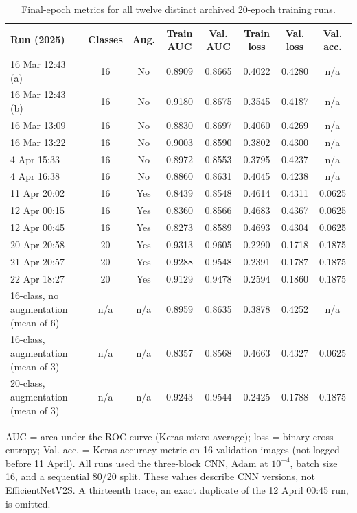 \documentclass[11pt]{article}
\begin{document}
\begin{table}[!htbp]
\centering\small
\caption{Final-epoch metrics for all twelve distinct archived 20-epoch training runs.}
\label{tab:training-runs}
\footnotesize\setlength{\tabcolsep}{3pt}
\begin{tabular}{lccccccc}
\toprule
Run (2025) & Classes & Aug. & Train AUC & Val. AUC & Train loss & Val. loss & Val. acc. \\
\midrule
16 Mar 12:43 (a) & 16 & No & 0.8909 & 0.8665 & 0.4022 & 0.4280 & n/a \\
16 Mar 12:43 (b) & 16 & No & 0.9180 & 0.8675 & 0.3545 & 0.4187 & n/a \\
16 Mar 13:09 & 16 & No & 0.8830 & 0.8697 & 0.4060 & 0.4269 & n/a \\
16 Mar 13:22 & 16 & No & 0.9003 & 0.8590 & 0.3802 & 0.4300 & n/a \\
4 Apr 15:33 & 16 & No & 0.8972 & 0.8553 & 0.3795 & 0.4237 & n/a \\
4 Apr 16:38 & 16 & No & 0.8860 & 0.8631 & 0.4045 & 0.4238 & n/a \\
11 Apr 20:02 & 16 & Yes & 0.8439 & 0.8548 & 0.4614 & 0.4311 & 0.0625 \\
12 Apr 00:15 & 16 & Yes & 0.8360 & 0.8566 & 0.4683 & 0.4367 & 0.0625 \\
12 Apr 00:45 & 16 & Yes & 0.8273 & 0.8589 & 0.4693 & 0.4304 & 0.0625 \\
20 Apr 20:58 & 20 & Yes & 0.9313 & 0.9605 & 0.2290 & 0.1718 & 0.1875 \\
21 Apr 20:57 & 20 & Yes & 0.9288 & 0.9548 & 0.2391 & 0.1787 & 0.1875 \\
22 Apr 18:27 & 20 & Yes & 0.9129 & 0.9478 & 0.2594 & 0.1860 & 0.1875 \\
\midrule
16-class, no augmentation (mean of 6) & n/a & n/a & 0.8959 & 0.8635 & 0.3878 & 0.4252 & n/a \\
16-class, augmentation (mean of 3) & n/a & n/a & 0.8357 & 0.8568 & 0.4663 & 0.4327 & 0.0625 \\
20-class, augmentation (mean of 3) & n/a & n/a & 0.9243 & 0.9544 & 0.2425 & 0.1788 & 0.1875 \\
\bottomrule
\end{tabular}
\vspace{0.75em}
\noindent\footnotesize AUC = area under the ROC curve (Keras micro-average); loss = binary cross-entropy; Val. acc. = Keras accuracy metric on 16 validation images (not logged before 11 April). All runs used the three-block CNN, Adam at $10^{-4}$, batch size 16, and a sequential 80/20 split. These values describe CNN versions, not EfficientNetV2S. A thirteenth trace, an exact duplicate of the 12 April 00:45 run, is omitted.\par
\end{table}
\end{document}
